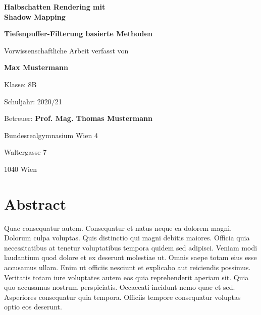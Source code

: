 \documentclass[12pt, a4paper]{article}
\begin{document}
\begin{titlepage}
    \centering
    \Large

    \vspace*{\fill}
    
    {\Huge\textbf{Halbschatten Rendering mit\\ Shadow Mapping}\par}
    \vspace{0.5cm}
    {\LARGE\textbf{Tiefenpuffer-Filterung basierte Methoden}}
    
    \vspace{3cm}
    
    Vorwissenschaftliche Arbeit verfasst von\par
    \textbf{Max Mustermann}\par
    
    \vspace{1.5cm}
    
    Klasse: 8B\par
    Schuljahr: 2020/21\par
    
    \vspace{1.5cm}
    
    Betreuer: \textbf{Prof. Mag. Thomas Mustermann}\par
    
    \vspace{3cm}
    
    Bundesrealgymnasium Wien 4\par
    Waltergasse 7\par
    1040 Wien
    
    \vspace*{\fill}
\end{titlepage}

\pagestyle{empty}
\setcounter{page}{2}
\section*{Abstract}

Quae consequatur autem. Consequatur et natus neque ea dolorem magni. Dolorum culpa voluptas. Quis distinctio qui magni debitis maiores. Officia quia necessitatibus at tenetur voluptatibus tempora quidem sed adipisci. Veniam modi laudantium quod dolore et ex deserunt molestiae ut. Omnis saepe totam eius esse accusamus ullam. Enim ut officiis nesciunt et explicabo aut reiciendis possimus. Veritatis totam iure voluptates autem eos quia reprehenderit aperiam sit. Quia quo accusamus nostrum perspiciatis. Occaecati incidunt nemo quae et sed. Asperiores consequatur quia tempora. Officiis tempore consequatur voluptas optio eos deserunt.
\end{document}
